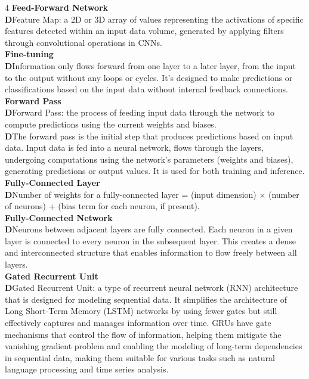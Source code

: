 \documentclass[8pt]{extarticle}
\newcommand{\dtag}{\textcolor{definitioncolor}{\tiny\textbf{D}}\;}
\begin{document}
\begin{multicols}{4}
\vspace{2pt}\textbf{Feed-Forward Network}\\
\dtag Feature Map: a 2D or 3D array of values representing the activations of specific features detected within an input data volume, generated by applying filters through convolutional operations in CNNs.\\
\vspace{2pt}\textbf{Fine-tuning}\\
\dtag Information only flows forward from one layer to a later layer, from the input to the output without any loops or cycles. It's designed to make predictions or classifications based on the input data without internal feedback connections.\\
\vspace{2pt}\textbf{Forward Pass}\\
\dtag Forward Pass: the process of feeding input data through the network to compute predictions using the current weights and biases.\\
\dtag The forward pass is the initial step that produces predictions based on input data. Input data is fed into a neural network, flows through the layers, undergoing computations using the network's parameters (weights and biases), generating predictions or output values. It is used for both training and inference.\\
\vspace{2pt}\textbf{Fully-Connected Layer}\\
\dtag Number of weights for a fully-connected layer = (input dimension) $\times$ (number of neurons) + (bias term for each neuron, if present).\\
\vspace{2pt}\textbf{Fully-Connected Network}\\
\dtag Neurons between adjacent layers are fully connected. Each neuron in a given layer is connected to every neuron in the subsequent layer. This creates a dense and interconnected structure that enables information to flow freely between all layers.\\
\vspace{2pt}\textbf{Gated Recurrent Unit}\\
\dtag Gated Recurrent Unit: a type of recurrent neural network (RNN) architecture that is designed for modeling sequential data. It simplifies the architecture of Long Short-Term Memory (LSTM) networks by using fewer gates but still effectively captures and manages information over time. GRUs have gate mechanisms that control the flow of information, helping them mitigate the vanishing gradient problem and enabling the modeling of long-term dependencies in sequential data, making them suitable for various tasks such as natural language processing and time series analysis.\\

\end{multicols}
\end{document}
